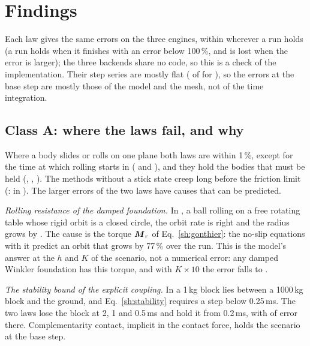 \section{Findings}\label{sh:findings}

Each law gives the same errors on the three engines, within 
wherever a run holds (a run holds when it finishes with an error below 100\,\%, and is lost
when the error is larger); the three backends share no code, so this is a check of the
implementation. Their step series are mostly flat ( of
 for ), so the errors at the base step are
mostly those of the model and the mesh, not of the time integration.

\subsection{Class A: where the laws fail, and why}\label{sh:classA}

Where a body slides or rolls on one plane both laws are within 1\,\%, except for the time at
which rolling starts in  ( and
), and they hold the bodies that must be held
(, , ). The methods without a stick state creep long before the friction limit (:
 in ). The larger errors of the two laws have causes that can
be predicted.

\emph{Rolling resistance of the damped foundation.} In , a ball rolling on a
free rotating table whose rigid orbit is a closed circle, the orbit rate is right and the
radius grows by . The cause is the torque $\boldsymbol{M}_r$ of
Eq.~\eqref{sh:gonthier}: the no-slip equations with it predict an orbit that grows by 77\,\%
over the run.
This is the model's answer at the $h$ and $K$ of the scenario, not a numerical error: any
damped Winkler foundation has this torque, and with $K\times10$ the error falls to .

\emph{The stability bound of the explicit coupling.} In  a 1\,kg block lies
between a 1000\,kg block and the ground, and Eq.~\eqref{sh:stability} requires a step below
0.25\,ms. The two laws lose the block at 2, 1 and 0.5\,ms and hold it from 0.2\,ms, with
 of error there. Complementarity contact, implicit in
the contact force, holds the scenario at the base step.


